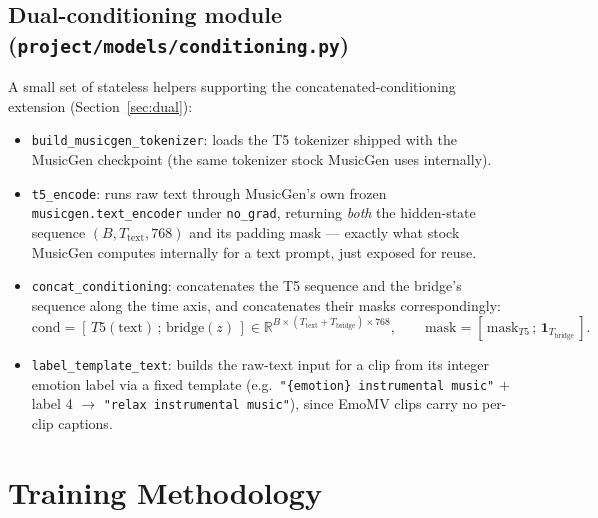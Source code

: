 \documentclass[11pt]{article}
\begin{document}
\subsection{Dual-conditioning module (\texttt{project/models/conditioning.py})}
\label{sec:dual-model}
A small set of stateless helpers supporting the concatenated-conditioning extension
(Section~\ref{sec:dual}):
\begin{itemize}
  \item \texttt{build\_musicgen\_tokenizer}: loads the T5 tokenizer shipped with the MusicGen
  checkpoint (the same tokenizer stock MusicGen uses internally).
  \item \texttt{t5\_encode}: runs raw text through MusicGen's own frozen
  \texttt{musicgen.text\_encoder} under \texttt{no\_grad}, returning \emph{both} the hidden-state
  sequence $(B,T_{\text{text}},768)$ and its padding mask --- exactly what stock MusicGen computes
  internally for a text prompt, just exposed for reuse.
  \item \texttt{concat\_conditioning}: concatenates the T5 sequence and the bridge's sequence along
  the time axis, and concatenates their masks correspondingly:
  \[
  \text{cond} = [\,T5(\text{text})\,;\,\text{bridge}(z)\,] \in \mathbb{R}^{B\times(T_{\text{text}}+T_{\text{bridge}})\times768},
  \qquad
  \text{mask} = [\,\text{mask}_{T5}\,;\,\mathbf{1}_{T_{\text{bridge}}}\,].
  \]
  \item \texttt{label\_template\_text}: builds the raw-text input for a clip from its integer
  emotion label via a fixed template (e.g.\ \texttt{"\{emotion\} instrumental music"} $+$ label 4
  $\to$ \texttt{"relax instrumental music"}), since EmoMV clips carry no per-clip captions.
\end{itemize}

\section{Training Methodology}
\label{sec:training}
\end{document}
